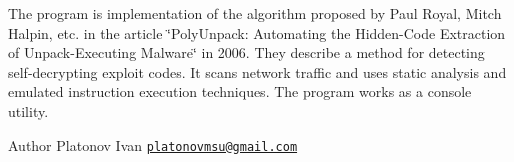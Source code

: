 The program is implementation of the algorithm proposed by Paul Royal, Mitch Halpin, etc. in the article \char`\"{}PolyUnpack: Automating the Hidden-\/Code
Extraction of Unpack-\/Executing Malware\char`\"{} in 2006. They describe a method for detecting self-\/decrypting exploit codes. It scans network traffic and uses static analysis and emulated instruction execution techniques. The program works as a console utility. \begin{DoxyAuthor}{Author}
Platonov Ivan \href{mailto:platonovmsu@gmail.com}{\tt platonovmsu@gmail.com} 
\end{DoxyAuthor}
